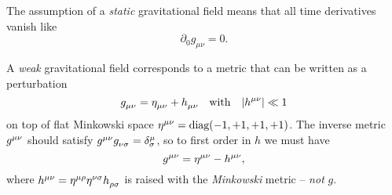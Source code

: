 The assumption of a \emph{static} gravitational field means that all time derivatives vanish like
\begin{equation}
	\partial_0 g_{\mu \nu} = 0 .
	\label{eq:weak_field_limit:static_field}
\end{equation}

A \emph{weak} gravitational field corresponds to a metric that can be written as a perturbation
\begin{equation}
	g\indices{_\mu_\nu} = \eta\indices{_\mu_\nu} + h\indices{_\mu_\nu}
	\quad \text{with} \quad
	\abs{h\indices{^\mu^\nu}} \ll 1
	\label{eq:weak_field_limit:weak_field_metric}
\end{equation}
on top of flat Minkowski space $\eta\indices{^\mu^\nu} = \text{diag}(-1, +1, +1, +1)$.
The inverse metric $g\indices{^\mu^\nu}$ should satisfy $g\indices{^\mu^\nu} g\indices{_\nu_\sigma} = \delta^\mu_\sigma$, so to first order in $h$ we must have
\begin{equation}
	g\indices{^\mu^\nu} = \eta\indices{^\mu^\nu} - h\indices{^\mu^\nu} ,
	\label{eq:weak_field_limit:weak_field_metric_inverse}
\end{equation}
where $h\indices{^\mu^\nu} = \eta\indices{^\mu^\rho} \eta\indices{^\nu^\sigma} h\indices{_\rho_\sigma}$ is raised with the \emph{Minkowski} metric -- \emph{not} $g$.

